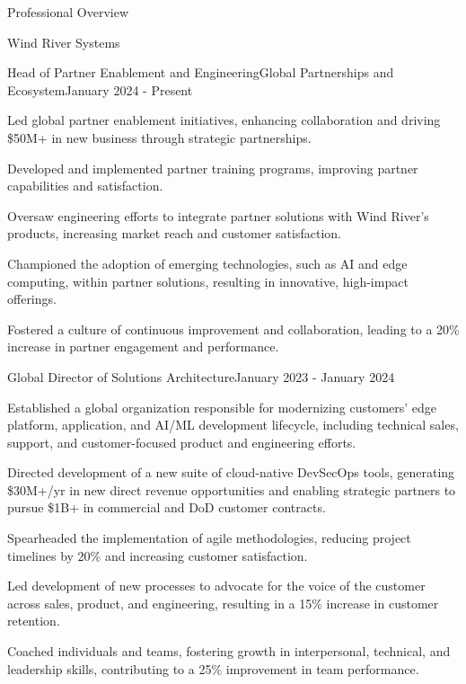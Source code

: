 \documentclass{resume} %
\begin{document}
\begin{rSection}{Professional Overview}
  
  \begin{rCompany}{Wind River Systems}{}{}

    \begin{rSubSubsection}{Head of Partner Enablement and Engineering}{Global Partnerships and Ecosystem}{January 2024 - Present}

      \item Led global partner enablement initiatives, enhancing collaboration and driving \$50M+ in new business through strategic partnerships.
      \item Developed and implemented partner training programs, improving partner capabilities and satisfaction.
      \item Oversaw engineering efforts to integrate partner solutions with Wind River's products, increasing market reach and customer satisfaction.
      \item Championed the adoption of emerging technologies, such as AI and edge computing, within partner solutions, resulting in innovative, high-impact offerings.
      \item Fostered a culture of continuous improvement and collaboration, leading to a 20\% increase in partner engagement and performance.

    \end{rSubSubsection}
    
    \begin{rSubSubsection}{Global Director of Solutions Architecture}{}{January 2023 - January 2024}

      \item Established a global organization responsible for modernizing customers' edge platform, application, and AI/ML development lifecycle, including technical sales, support, and customer-focused product and engineering efforts.
      \item Directed development of a new suite of cloud-native DevSecOps tools, generating \$30M+/yr in new direct revenue opportunities and enabling strategic partners to pursue \$1B+ in commercial and DoD customer contracts.
      \item Spearheaded the implementation of agile methodologies, reducing project timelines by 20\% and increasing customer satisfaction.
      \item Led development of new processes to advocate for the voice of the customer across sales, product, and engineering, resulting in a 15\% increase in customer retention.
      \item Coached individuals and teams, fostering growth in interpersonal, technical, and leadership skills, contributing to a 25\% improvement in team performance.


\end{rSubSubsection}
\end{rCompany}
\end{rSection}
\end{document}
